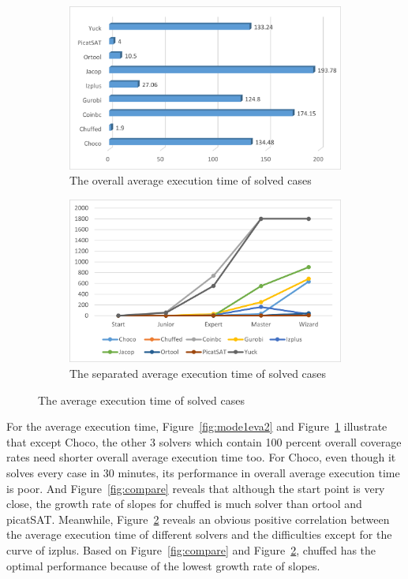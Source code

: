 \begin{figure}[htbp]
\centering
\begin{subfigure}{0.48\textwidth}
\includegraphics[width=\textwidth]{figs/mode1averagetime.png}
\caption{The overall average execution time of solved cases}
\label{fig:mode1averagetime1}
\end{subfigure}
\begin{subfigure}{0.48\textwidth}
\includegraphics[width=\textwidth]{figs/mode1seperatedtime.png}
\caption{The separated average execution time of solved cases}
\label{fig:mode1averagetime2}
\end{subfigure}
\caption{The average execution time of solved cases}
\label{fig:mode1averagetime}
\end{figure}
For the average execution time, Figure~\ref{fig:mode1eva2} and Figure~\ref{fig:mode1averagetime1} illustrate that except Choco, the other 3 solvers which contain 100 percent overall coverage rates need shorter overall average execution time too. For Choco, even though it solves every case in 30 minutes, its performance in overall average execution time is poor. And Figure~\ref{fig:compare} reveals that although the start point is very close, the growth rate of slopes for chuffed is much solver than ortool and picatSAT. Meanwhile, Figure~\ref{fig:mode1averagetime2} reveals an obvious positive correlation between the average execution time of different solvers and the difficulties except for the curve of izplus. Based on Figure~\ref{fig:compare} and Figure~\ref{fig:mode1averagetime2}, chuffed has the optimal performance because of the lowest growth rate of slopes. 

